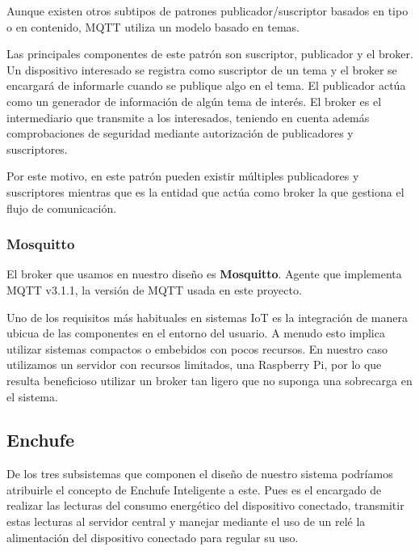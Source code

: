 \documentclass[a4paper,10pt]{article}
\begin{document}
Aunque existen otros subtipos de patrones publicador/suscriptor
basados en tipo o en contenido\cite{p.th.eugsterManyFacesPublish},
MQTT utiliza un modelo basado en temas.

Las principales componentes de este patrón son suscriptor, publicador
y el broker. Un dispositivo interesado se registra como suscriptor de
un tema y el broker se encargará de informarle cuando se publique algo
en el tema. El publicador actúa como un generador de información de
algún tema de interés. El broker es el intermediario que transmite a
los interesados, teniendo en cuenta además comprobaciones de seguridad
mediante autorización de publicadores y
suscriptores.\cite{al-fuqahaInternetThingsSurvey2015,hunkelerMQTTSPublishSubscribe2008}

Por este motivo, en este patrón pueden existir múltiples publicadores
y suscriptores mientras que es la entidad que actúa como broker la que
gestiona el flujo de comunicación.

\subsubsection{Mosquitto}\label{subsubsec:broker_mosquitto}

El broker que usamos en nuestro diseño es
\textbf{Mosquitto}\cite{EclipseMosquitto}. Agente que implementa MQTT
v3.1.1, la versión de MQTT usada en este proyecto.

Uno de los requisitos más habituales en sistemas IoT es la integración
de manera ubicua de las componentes en el entorno del usuario. A
menudo esto implica utilizar sistemas compactos o embebidos con pocos
recursos. En nuestro caso utilizamos un servidor con recursos
limitados, una Raspberry Pi, por lo que resulta beneficioso utilizar
un broker tan ligero que no suponga una sobrecarga en el sistema.

\newpage

\subsection{Enchufe}\label{subsec:enchufe}

De los tres subsistemas que componen el diseño de nuestro sistema
podríamos atribuirle el concepto de Enchufe Inteligente a este. Pues
es el encargado de realizar las lecturas del consumo energético del
dispositivo conectado, transmitir estas lecturas al servidor central y
manejar mediante el uso de un relé la alimentación del dispositivo
conectado para regular su uso.
\end{document}

